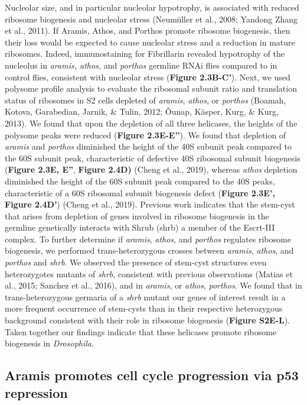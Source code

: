 \documentclass[12pt,oneside]{reedthesis}
\begin{document}
Nucleolar size, and in particular nucleolar hypotrophy, is associated
with reduced ribosome biogenesis and nucleolar stress (Neumüller et al., 2008; Yandong Zhang et al., 2011). If Aramis, Athos, and Porthos
promote ribosome biogenesis, then their loss would be expected to cause
nucleolar stress and a reduction in mature ribosomes. Indeed,
immunostaining for Fibrillarin revealed hypotrophy of the nucleolus in
\emph{aramis, athos,} and \emph{porthos} germline RNAi flies compared to in
control flies, consistent with nucleolar stress (\textbf{Figure 2.3B-C'}).
Next, we used polysome profile analysis to evaluate the ribosomal
subunit ratio and translation status of ribosomes in S2 cells depleted
of \emph{aramis}, \emph{athos}, or \emph{porthos}
(Boamah, Kotova, Garabedian, Jarnik, \& Tulin, 2012; Õunap, Käsper, Kurg, \& Kurg, 2013).
We found that upon the depletion of all three helicases, the heights of
the polysome peaks were reduced (\textbf{Figure 2.3E-E''}). We found that
depletion of \emph{aramis} and \emph{porthos} diminished the height of the 40S
subunit peak compared to the 60S subunit peak, characteristic of
defective 40S ribosomal subunit biogenesis (\textbf{Figure 2.3E, E''}, \textbf{Figure 2.4D)} (Cheng et al., 2019),
whereas \emph{athos} depletion
diminished the height of the 60S subunit peak compared to the 40S peaks,
characteristic of a 60S ribosomal subunit biogenesis defect (\textbf{Figure 2.3E', Figure 2.4D'}) (Cheng et al., 2019).
Previous work indicates that the stem-cyst that arises from depletion of genes
involved in ribosome biogenesis in the germline genetically interacts
with Shrub (shrb) a member of the Escrt-III complex. To further
determine if \emph{aramis}, \emph{athos}, and \emph{porthos} regulates ribosome
biogenesis, we performed trans-heterozygous crosses between \emph{aramis},
\emph{athos}, and \emph{porthos} and \emph{shrb}. We observed the presence of stem-cyst
structures even heterozygotes mutants of \emph{shrb}, consistent with
previous observations (Matias et al., 2015; Sanchez et al., 2016), and in
\emph{aramis}, or \emph{athos}, \emph{porthos}. We found that in trans-heterozygous
germaria of a \emph{shrb} mutant our genes of interest result in a more
frequent occurrence of stem-cysts than in their respective heterozygous
background consistent with their role in ribosome biogenesis (\textbf{Figure
S2E-L}). Taken together our findings indicate that these helicases
promote ribosome biogenesis in \emph{Drosophila}.

\hypertarget{aramis-promotes-cell-cycle-progression-via-p53-repression}{%
\subsection{Aramis promotes cell cycle progression via p53 repression}\label{aramis-promotes-cell-cycle-progression-via-p53-repression}}
\end{document}
